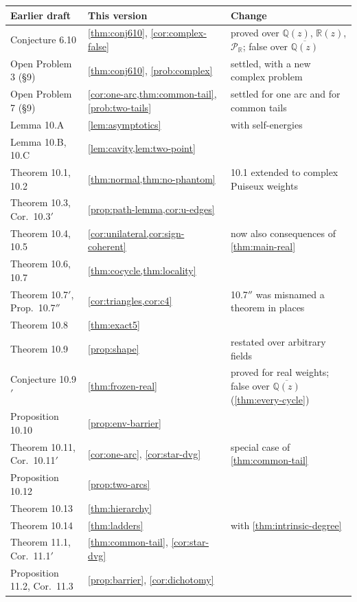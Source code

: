 \documentclass[11pt]{amsart}
\theoremstyle{plain}
\theoremstyle{definition}
\theoremstyle{remark}
\numberwithin{equation}{section}
\newcommand{\QQ}{\mathbb{Q}}
\newcommand{\RR}{\mathbb{R}}
\newcommand{\Qz}{\QQ(z)}
\newcommand{\Rz}{\RR(z)}
\newcommand{\Qzbar}{\overline{\QQ(z)}}
\newcommand{\Puis}{\mathcal{P}_{\RR}}
\begin{document}
\begin{center}\small
\begin{longtable}{@{}L{0.29}L{0.33}L{0.31}@{}}
\toprule
Earlier draft & This version & Change\\ \midrule\endhead
Conjecture 6.10 & \cref{thm:conj610}, \cref{cor:complex-false} & proved over $\Qz$, $\Rz$, $\Puis$; false over $\Qzbar$\\
Open Problem 3 (\S9) & \cref{thm:conj610}, \cref{prob:complex} & settled, with a new complex problem\\
Open Problem 7 (\S9) & \cref{cor:one-arc,thm:common-tail}, \cref{prob:two-tails} & settled for one arc and for common tails\\
Lemma 10.A & \cref{lem:asymptotics} & with self-energies\\
Lemma 10.B, 10.C & \cref{lem:cavity,lem:two-point} & \\
Theorem 10.1, 10.2 & \cref{thm:normal,thm:no-phantom} & 10.1 extended to complex Puiseux weights\\
Theorem 10.3, Cor.\ 10.3$'$ & \cref{prop:path-lemma,cor:u-edges} & \\
Theorem 10.4, 10.5 & \cref{cor:unilateral,cor:sign-coherent} & now also consequences of \cref{thm:main-real}\\
Theorem 10.6, 10.7 & \cref{thm:cocycle,thm:locality} & \\
Theorem 10.7$'$, Prop.\ 10.7$''$ & \cref{cor:triangles,cor:c4} & 10.7$''$ was misnamed a theorem in places\\
Theorem 10.8 & \cref{thm:exact5} & \\
Theorem 10.9 & \cref{prop:shape} & restated over arbitrary fields\\
Conjecture 10.9$'$ & \cref{thm:frozen-real} & proved for real weights; false over $\Qzbar$ (\cref{thm:every-cycle})\\
Proposition 10.10 & \cref{prop:env-barrier} & \\
Theorem 10.11, Cor.\ 10.11$'$ & \cref{cor:one-arc}, \cref{cor:star-dvg} & special case of \cref{thm:common-tail}\\
Proposition 10.12 & \cref{prop:two-arcs} & \\
Theorem 10.13 & \cref{thm:hierarchy} & \\
Theorem 10.14 & \cref{thm:ladders} & with \cref{thm:intrinsic-degree}\\
Theorem 11.1, Cor.\ 11.1$'$ & \cref{thm:common-tail}, \cref{cor:star-dvg} & \\
Proposition 11.2, Cor.\ 11.3 & \cref{prop:barrier}, \cref{cor:dichotomy} & \\

\end{longtable}
\end{center}
\end{document}
